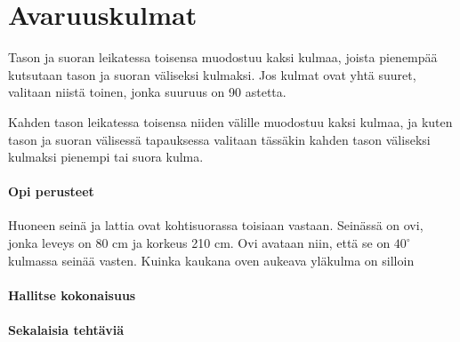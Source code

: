 \section*{Avaruuskulmat}

Tason ja suoran leikatessa toisensa muodostuu kaksi kulmaa, joista pienempää kutsutaan tason ja suoran väliseksi kulmaksi. Jos kulmat ovat yhtä suuret, valitaan niistä toinen, jonka suuruus on 90 astetta. %

Kahden tason leikatessa toisensa niiden välille muodostuu kaksi kulmaa, ja kuten tason ja suoran välisessä tapauksessa valitaan tässäkin kahden tason väliseksi kulmaksi pienempi tai suora kulma.

\begin{tehtavasivu}

\paragraph*{Opi perusteet}

\begin{tehtava}
Huoneen seinä ja lattia ovat kohtisuorassa toisiaan vastaan. Seinässä on ovi, jonka leveys on 80 cm ja korkeus 210 cm. Ovi avataan niin, että se on $40^\circ$ kulmassa seinää vasten.
Kuinka kaukana oven aukeava yläkulma on silloin
\begin{alakohdat}
\end{alakohdat}
\begin{vastaus}
\begin{alakohdat}
\alakohta{55 cm}
\alakohta{51 cm}
\alakohta{220 cm}
\end{alakohdat}
\end{vastaus}
\end{tehtava}

\paragraph*{Hallitse kokonaisuus}

\paragraph*{Sekalaisia tehtäviä}

\end{tehtavasivu}